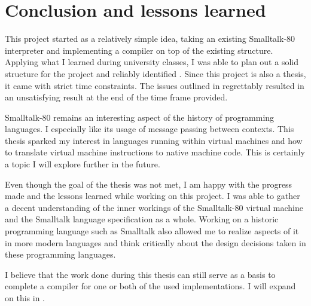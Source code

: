 \chapter{Conclusion and lessons learned}

This project started as a relatively simple idea, taking an existing Smalltalk-80 interpreter and implementing a \jit{} compiler on top of the existing structure. 
Applying what I learned during university classes, I was able to plan out a solid structure for the project and reliably identified \bbs{}.
Since this project is also a thesis, it came with strict time constraints. The issues outlined in  regrettably resulted in an unsatisfying result at the end of the time frame provided.

Smalltalk-80 remains an interesting aspect of the history of programming languages. I especially like its usage of message passing between contexts. This thesis sparked my interest in languages running within virtual machines and how to translate virtual machine instructions to native machine code. This is certainly a topic I will explore further in the future.

Even though the goal of the thesis was not met, I am happy with the progress made and the lessons learned while working on this project. 
I was able to gather a decent understanding of the inner workings of the Smalltalk-80 virtual machine and the Smalltalk language specification as a whole. Working on a historic programming language such as Smalltalk also allowed me to realize aspects of it in more modern languages and think critically about the design decisions taken in these programming languages.

I believe that the work done during this thesis can still serve as a basis to complete a \jit{} compiler for one or both of the used implementations. I will expand on this in .
